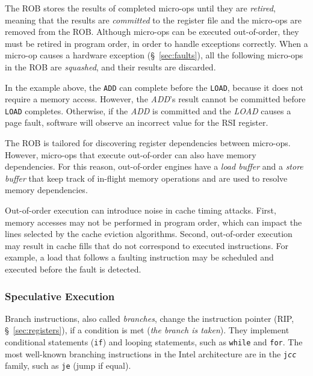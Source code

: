 The ROB stores the results of completed micro-ops until they are
\textit{retired}, meaning that the results are \textit{committed} to the
register file and the micro-ops are removed from the ROB. Although micro-ops
can be executed out-of-order, they must be retired in program order, in order
to handle exceptions correctly. When a micro-op causes a hardware exception
(\S~\ref{sec:faults}), all the following micro-ops in the ROB are
\textit{squashed}, and their results are discarded.

In the example above, the \texttt{ADD} can complete before the \texttt{LOAD},
because it does not require a memory access. However, the \textit{ADD}'s result
cannot be committed before \texttt{LOAD} completes. Otherwise, if the
\textit{ADD} is committed and the \textit{LOAD} causes a page fault, software
will observe an incorrect value for the  RSI register.


The ROB is tailored for discovering register dependencies between micro-ops.
However, micro-ops that execute out-of-order can also have memory dependencies.
For this reason, out-of-order engines have a \textit{load buffer} and a
\textit{store buffer} that keep track of in-flight memory operations and are
used to resolve memory dependencies.

Out-of-order execution can introduce noise in cache timing attacks. First,
memory accesses may not be performed in program order, which can impact the
lines selected by the cache eviction algorithms. Second, out-of-order execution
may result in cache fills that do not correspond to executed instructions. For
example, a load that follows a faulting instruction may be scheduled and
executed before the fault is detected.


\subsubsection{Speculative Execution}


Branch instructions, also called \textit{branches}, change the instruction
pointer (RIP, \S~\ref{sec:registers}), if a condition is met (\textit{the
branch is taken}). They implement conditional statements (\texttt{if}) and
looping statements, such as \texttt{while} and \texttt{for}. The most
well-known branching instructions in the Intel architecture are in the
\texttt{j\textit{cc}} family, such as \texttt{je} (jump if equal).

